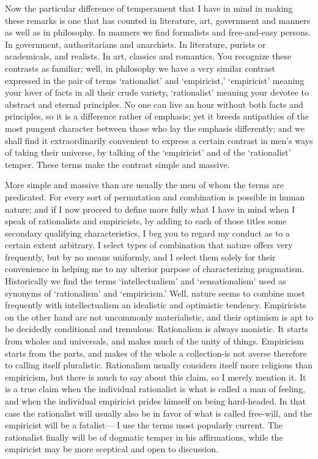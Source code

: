 \documentclass[]{article}
\begin{document}
Now the particular difference of temperament that I have in mind
in making these remarks is one that has counted in literature, art,
government and manners as well as in philosophy. In manners we find
formalists and free-and-easy persons. In government, authoritarians and
anarchists. In literature, purists or academicals, and realists. In art,
classics and romantics. You recognize these contrasts as familiar; well,
in philosophy we have a very similar contrast expressed in the pair of
terms `rationalist' and `empiricist,' `empiricist' meaning your lover of
facts in all their crude variety, `rationalist' meaning your devotee to
abstract and eternal principles. No one can live an hour without both
facts and principles, so it is a difference rather of emphasis; yet it
breeds antipathies of the most pungent character between those who
lay the emphasis differently; and we shall find it extraordinarily
convenient to express a certain contrast in men's ways of taking their
universe, by talking of the `empiricist' and of the `rationalist'
temper. These terms make the contrast simple and massive.

More simple and massive than are usually the men of whom the terms are
predicated. For every sort of permutation and combination is possible in
human nature; and if I now proceed to define more fully what I have in
mind when I speak of rationalists and empiricists, by adding to each
of those titles some secondary qualifying characteristics, I beg you to
regard my conduct as to a certain extent arbitrary. I select types
of combination that nature offers very frequently, but by no means
uniformly, and I select them solely for their convenience in helping
me to my ulterior purpose of characterizing pragmatism. Historically we
find the terms `intellectualism' and `sensationalism' used as synonyms
of `rationalism' and `empiricism.' Well, nature seems to combine most
frequently with intellectualism an idealistic and optimistic tendency.
Empiricists on the other hand are not uncommonly materialistic, and
their optimism is apt to be decidedly conditional and tremulous.
Rationalism is always monistic. It starts from wholes and universals,
and makes much of the unity of things. Empiricism starts from the parts,
and makes of the whole a collection-is not averse therefore to calling
itself pluralistic. Rationalism usually considers itself more religious
than empiricism, but there is much to say about this claim, so I merely
mention it. It is a true claim when the individual rationalist is what
is called a man of feeling, and when the individual empiricist prides
himself on being hard-headed. In that case the rationalist will usually
also be in favor of what is called free-will, and the empiricist will
be a fatalist--- I use the terms most popularly current. The rationalist
finally will be of dogmatic temper in his affirmations, while the
empiricist may be more sceptical and open to discussion.
\end{document}
